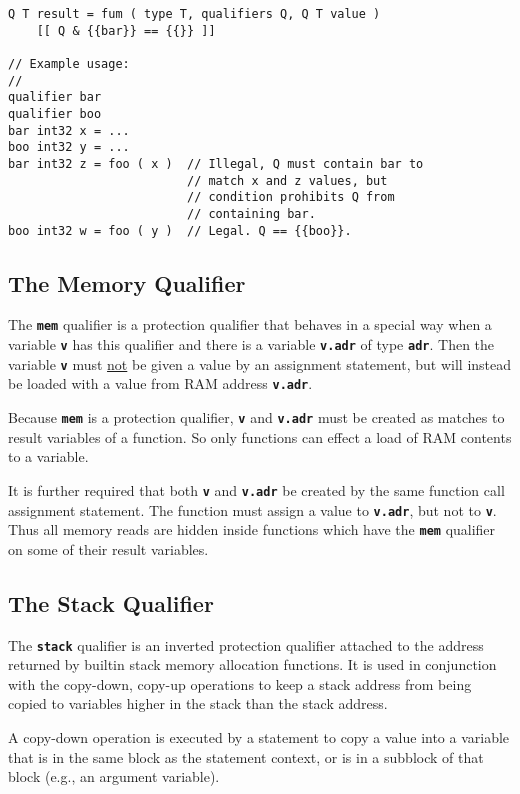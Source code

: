 \documentclass[12pt]{article}
\makeatletter
\newcommand{\TT}[1]{{\tt \bfseries #1}}
\newcommand{\ttkey}[1]{\TT{#1}\index{#1@{\tt #1}}}
\newenvironment{indpar}[1][0.3in]%
	{\begin{list}{}%
		     {\setlength{\itemsep}{0in}%
		      \setlength{\topsep}{0in}%
		      \setlength{\parsep}{1ex}%
		      \setlength{\labelwidth}{#1}%
		      \setlength{\leftmargin}{#1}%
		      \addtolength{\leftmargin}{\labelsep}}%
	 \item}%
	{\end{list}}
\makeatother
\begin{document}
\begin{indpar}\begin{verbatim}
Q T result = fum ( type T, qualifiers Q, Q T value )
    [[ Q & {{bar}} == {{}} ]]

// Example usage:
//
qualifier bar
qualifier boo
bar int32 x = ...
boo int32 y = ...
bar int32 z = foo ( x )  // Illegal, Q must contain bar to
                         // match x and z values, but
                         // condition prohibits Q from
                         // containing bar.
boo int32 w = foo ( y )  // Legal. Q == {{boo}}.
\end{verbatim}\end{indpar}

\subsection{The Memory Qualifier}
\label{THE-MEM-QUALIFIER}

The \ttkey{mem} qualifier is a protection qualifier that behaves
in a special way when a variable \TT{v} has this qualifier and
there is a variable \TT{v.adr} of type \TT{adr}.  Then the
variable \TT{v} must \underline{not} be given a value by an
assignment statement, but will instead be loaded with a value
from RAM address \TT{v.adr}.

Because \TT{mem} is a protection qualifier, \TT{v} and \TT{v.adr}
must be created as matches to result variables of a function.
So only functions can effect a load of RAM contents to a variable.

It is further required that both \TT{v} and \TT{v.adr} be created
by the same function call assignment statement.
The function must assign a value to
\TT{v.adr}, but not to \TT{v}.  Thus all memory reads are hidden
inside functions which have the \TT{mem} qualifier on some of
their result variables.


\subsection{The Stack Qualifier}
\label{THE-STACK-QUALIFIER}

The \ttkey{stack} qualifier is an inverted protection qualifier
attached to the address returned by builtin stack memory
allocation functions.  It is used in conjunction with the 
copy-down, copy-up operations
to keep a stack address from being copied to variables higher
in the stack than the stack address.

A copy-down operation is executed by a statement to copy
a value into a variable that is in the same block as the
statement context, or is in a subblock of that block
(e.g., an argument variable).
\end{document}
